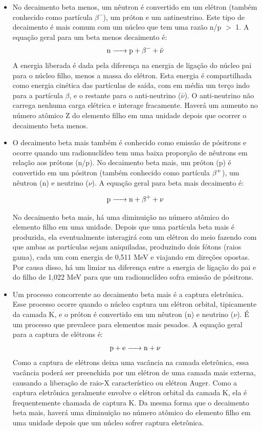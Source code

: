 \documentclass[11pt,a4paper]{article}
\newcounter{exemplo}
\begin{document}
\begin{exemplo}
\begin{itemize}
	   \item No decaimento beta menos, um nêutron é convertido em um elétron (também conhecido como partícula $\beta^-$), um próton e um antineutrino. Este tipo de decaimento é mais comum com um núcleo que tem uma razão n/p $>$ 1. A equação geral para um beta menos decaimento é:
		$$\ce{n -> p + \beta- + \bar{\nu}}$$
	   A energia liberada é dada pela diferença na energia de ligação do núcleo pai para o núcleo filho, menos a massa do elétron. Esta energia é compartilhada como energia cinética das partículas de saída, com em média um terço indo para a partícula $\beta$, e o restante para o anti-neutrino ($\bar{\nu}$). O anti-neutrino não carrega nenhuma carga elétrica e interage fracamente. Haverá um aumento no número atômico Z do elemento filho em uma unidade depois que ocorrer o decaimento beta menos.

       \item O decaimento beta mais também é conhecido como emissão de pósitrons e ocorre quando um radionuclídeo tem uma baixa proporção de nêutrons em relação aos prótons (n/p). No decaimento beta mais, um próton (p) é convertido em um pósitron (também conhecido como partícula $\ce{\beta+}$), um nêutron (n) e neutrino ($\nu$). A equação geral para beta mais decaimento é:
       
		$$\ce{p -> n + \beta+ + \nu}$$

	   No decaimento beta mais, há uma diminuição no número atômico do elemento filho em uma unidade. Depois que uma partícula beta mais é produzida, ela eventualmente interagirá com um elétron do meio fazendo com que ambas as partículas sejam aniquiladas, produzindo dois fótons (raios gama), cada um com energia de 0,511 MeV e viajando em direções opostas. Por causa disso, há um limiar na diferença entre a energia de ligação do pai e do filho de 1,022 MeV para que um radionuclídeo sofra emissão de pósitrons.

	   \item Um processo concorrente ao decaimento beta mais é a captura eletrônica. Esse processo ocorre quando o núcleo captura um elétron orbital, tipicamente da camada K, e o próton é convertido em um nêutron (n) e neutrino ($\nu$). É um processo que prevalece para elementos mais pesados. A equação geral para a captura de elétrons é:
	   $$\ce{p + e -> n + \nu}$$
	   Como a captura de elétrons deixa uma vacância na camada eletrônica, essa vacância poderá ser preenchida por um elétron de uma camada mais externa, causando a liberação de raio-X característico ou elétron Auger. Como a captura eletrônica geralmente envolve o elétron orbital da camada K, ela é frequentemente chamada de captura K. Da mesma forma que o decaimento beta mais, haverá uma diminuição no número atômico do elemento filho em uma unidade depois que um núcleo sofrer captura eletrônica.


\end{itemize}
\end{exemplo}
\end{document}
